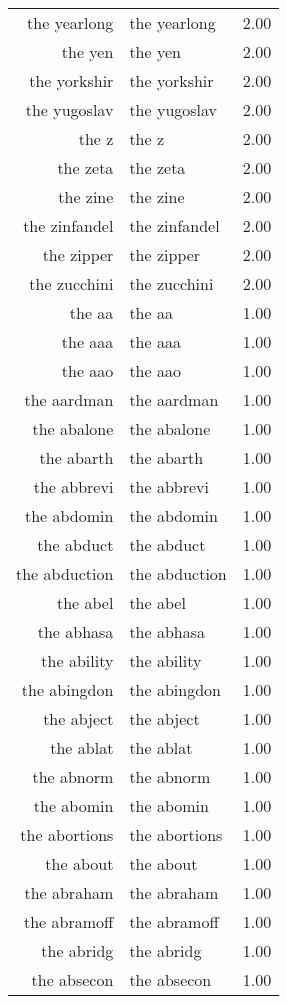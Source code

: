 \begin{table}[ht]
\begin{tabular}{rlr}
  the yearlong & the yearlong & 2.00 \\ 
  the yen & the yen & 2.00 \\ 
  the yorkshir & the yorkshir & 2.00 \\ 
  the yugoslav & the yugoslav & 2.00 \\ 
  the z & the z & 2.00 \\ 
  the zeta & the zeta & 2.00 \\ 
  the zine & the zine & 2.00 \\ 
  the zinfandel & the zinfandel & 2.00 \\ 
  the zipper & the zipper & 2.00 \\ 
  the zucchini & the zucchini & 2.00 \\ 
  the aa & the aa & 1.00 \\ 
  the aaa & the aaa & 1.00 \\ 
  the aao & the aao & 1.00 \\ 
  the aardman & the aardman & 1.00 \\ 
  the abalone & the abalone & 1.00 \\ 
  the abarth & the abarth & 1.00 \\ 
  the abbrevi & the abbrevi & 1.00 \\ 
  the abdomin & the abdomin & 1.00 \\ 
  the abduct & the abduct & 1.00 \\ 
  the abduction & the abduction & 1.00 \\ 
  the abel & the abel & 1.00 \\ 
  the abhasa & the abhasa & 1.00 \\ 
  the ability & the ability & 1.00 \\ 
  the abingdon & the abingdon & 1.00 \\ 
  the abject & the abject & 1.00 \\ 
  the ablat & the ablat & 1.00 \\ 
  the abnorm & the abnorm & 1.00 \\ 
  the abomin & the abomin & 1.00 \\ 
  the abortions & the abortions & 1.00 \\ 
  the about & the about & 1.00 \\ 
  the abraham & the abraham & 1.00 \\ 
  the abramoff & the abramoff & 1.00 \\ 
  the abridg & the abridg & 1.00 \\ 
  the absecon & the absecon & 1.00 \\ 

\end{tabular}
\end{table}
